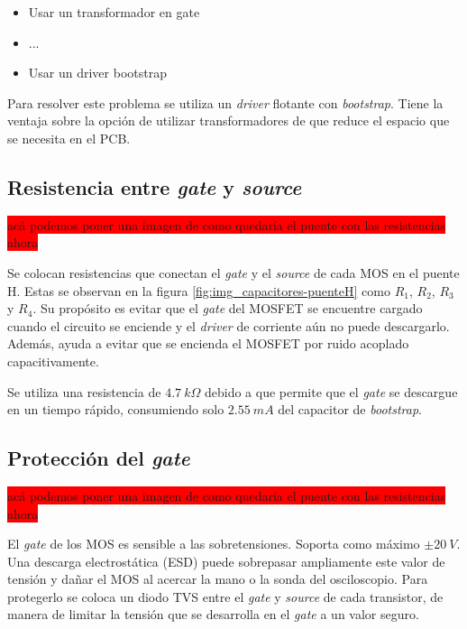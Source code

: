 \begin{itemize}
	\item Usar un transformador en gate
	\item ...
	\item Usar un driver bootstrap
\end{itemize}

Para resolver este problema se utiliza un \textsl{driver} flotante con \textsl{bootstrap}. Tiene la ventaja sobre la opción de utilizar transformadores de que reduce el espacio que se necesita en el PCB.


\subsection{Resistencia entre \textsl{gate} y \textsl{source}} \label{secc_res_gate_source}

\colorbox{red}{acá podemos poner una imagen de como quedaría el puente con las resistencias ahora}

\noindent Se colocan resistencias que conectan el \textsl{gate} y el \textsl{source} de cada MOS en el puente H. Estas se observan en la figura \ref{fig:img_capacitores-puenteH} como $R_1$, $R_2$, $R_3$ y $R_4$. Su propósito es evitar que el \textsl{gate} del MOSFET se encuentre cargado cuando el circuito se enciende y el \textsl{driver} de corriente aún no puede descargarlo. Además, ayuda a evitar que se encienda el MOSFET por ruido acoplado capacitivamente. 

\noindent Se utiliza una resistencia de $4.7 \:k\Omega$ debido a que permite que el \textsl{gate} se descargue en un tiempo rápido, consumiendo solo $2.55\:mA$ del capacitor de \textsl{bootstrap}.

\subsection{Protección del \textsl{gate}}

\colorbox{red}{acá podemos poner una imagen de como quedaría el puente con las resistencias ahora}

\noindent El \textsl{gate} de los MOS es sensible a las sobretensiones. Soporta como máximo $\pm 20\:V$. Una descarga electrostática (ESD) puede sobrepasar ampliamente este valor de tensión y dañar el MOS al acercar la mano o la sonda del osciloscopio. Para protegerlo se coloca un diodo TVS entre el \textsl{gate} y \textsl{source} de cada transistor, de manera de limitar la tensión que se desarrolla en el \textsl{gate} a un valor seguro.

